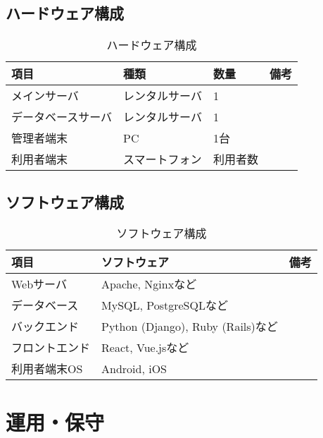 \documentclass[a4j, 11pt, report]{jsarticle}
\begin{document}
\subsection{ハードウェア構成}
\begin{table}[H]
    \centering
    \caption{ハードウェア構成}
    \label{tab:hardware}
    \begin{tabularx}{0.9\textwidth}{|l|X|X|X|}
        \hline
        \textbf{項目} & \textbf{種類} & \textbf{数量} & \textbf{備考} \\ \hline
        メインサーバ & レンタルサーバ & 1 & \\ \hline
        データベースサーバ & レンタルサーバ & 1 & \\ \hline
        管理者端末 & PC & 1台 & \\ \hline
        利用者端末 & スマートフォン & 利用者数 & \\ \hline
    \end{tabularx}
\end{table}

\subsection{ソフトウェア構成}
\begin{table}[H]
    \centering
    \caption{ソフトウェア構成}
    \label{tab:software}
    \begin{tabularx}{0.9\textwidth}{|l|X|X|}
        \hline
        \textbf{項目} & \textbf{ソフトウェア} & \textbf{備考} \\ \hline
        Webサーバ & Apache, Nginxなど & \\ \hline
        データベース & MySQL, PostgreSQLなど & \\ \hline
        バックエンド & Python (Django), Ruby (Rails)など & \\ \hline
        フロントエンド & React, Vue.jsなど & \\ \hline
        利用者端末OS & Android, iOS & \\ \hline
    \end{tabularx}
\end{table}

\section{運用・保守}
\end{document}
